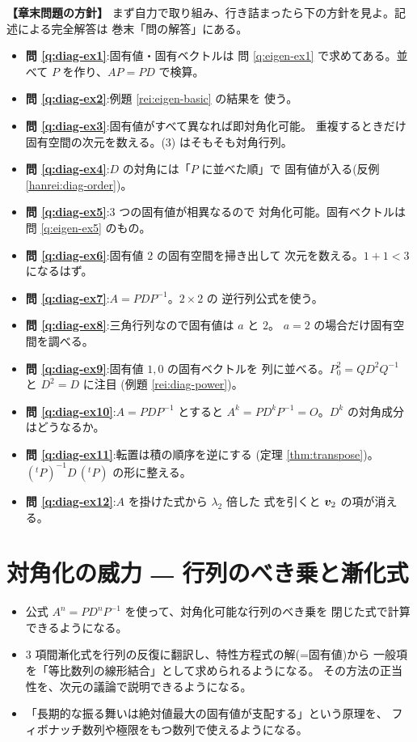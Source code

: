 \bigskip
{\small
\noindent\textbf{【章末問題の方針】}\quad
まず自力で取り組み、行き詰まったら下の方針を見よ。記述による完全解答は
巻末「問の解答」にある。
\begin{itemize}
\item \textbf{問 \ref{q:diag-ex1}}:固有値・固有ベクトルは
問 \ref{q:eigen-ex1} で求めてある。並べて $P$ を作り、$AP = PD$ で検算。
\item \textbf{問 \ref{q:diag-ex2}}:例題 \ref{rei:eigen-basic} の結果を
使う。
\item \textbf{問 \ref{q:diag-ex3}}:固有値がすべて異なれば即対角化可能。
重複するときだけ固有空間の次元を数える。(3) はそもそも対角行列。
\item \textbf{問 \ref{q:diag-ex4}}:$D$ の対角には「$P$ に並べた順」で
固有値が入る(反例 \ref{hanrei:diag-order})。
\item \textbf{問 \ref{q:diag-ex5}}:$3$ つの固有値が相異なるので
対角化可能。固有ベクトルは問 \ref{q:eigen-ex5} のもの。
\item \textbf{問 \ref{q:diag-ex6}}:固有値 $2$ の固有空間を掃き出して
次元を数える。$1 + 1 < 3$ になるはず。
\item \textbf{問 \ref{q:diag-ex7}}:$A = PDP^{-1}$。$2 \times 2$ の
逆行列公式を使う。
\item \textbf{問 \ref{q:diag-ex8}}:三角行列なので固有値は $a$ と $2$。
$a = 2$ の場合だけ固有空間を調べる。
\item \textbf{問 \ref{q:diag-ex9}}:固有値 $1, 0$ の固有ベクトルを
列に並べる。$P_0^2 = QD^2Q^{-1}$ と $D^2 = D$ に注目
(例題 \ref{rei:diag-power})。
\item \textbf{問 \ref{q:diag-ex10}}:$A = PDP^{-1}$ とすると
$A^k = PD^kP^{-1} = O$。$D^k$ の対角成分はどうなるか。
\item \textbf{問 \ref{q:diag-ex11}}:転置は積の順序を逆にする
(定理 \ref{thm:transpose})。$({}^tP)^{-1}D\,({}^tP)$ の形に整える。
\item \textbf{問 \ref{q:diag-ex12}}:$A$ を掛けた式から $\lambda_2$ 倍した
式を引くと $\bm{v}_2$ の項が消える。
\end{itemize}
}

\chapter{対角化の威力 ― 行列のべき乗と漸化式}\label{chap:power}

\begin{goal}
\begin{itemize}
\item 公式 $A^n = PD^nP^{-1}$ を使って、対角化可能な行列のべき乗を
閉じた式で計算できるようになる。
\item $3$ 項間漸化式を行列の反復に翻訳し、特性方程式の解(=固有値)から
一般項を「等比数列の線形結合」として求められるようになる。
その方法の正当性を、次元の議論で説明できるようになる。
\item 「長期的な振る舞いは絶対値最大の固有値が支配する」という原理を、
フィボナッチ数列や極限をもつ数列で使えるようになる。
\end{itemize}
\end{goal}

